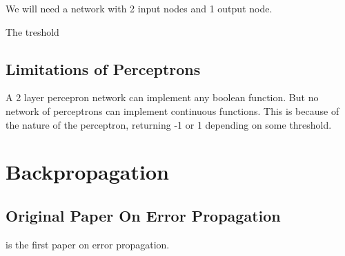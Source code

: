\documentclass[10pt,a4paper]{article}
\begin{document}
We will need a network with 2 input nodes and 1 output node. 

The treshold 
\subsection{Limitations of Perceptrons}

A 2 layer percepron network can implement any boolean function. But no network of perceptrons can implement continuous functions. This is because of the nature of the perceptron, returning -1 or 1 depending on some threshold.

\citep{Michell2009}
\section{Backpropagation}
\subsection{Original Paper On Error Propagation}
\cite{rumel} is the first paper on error propagation.
\end{document}
